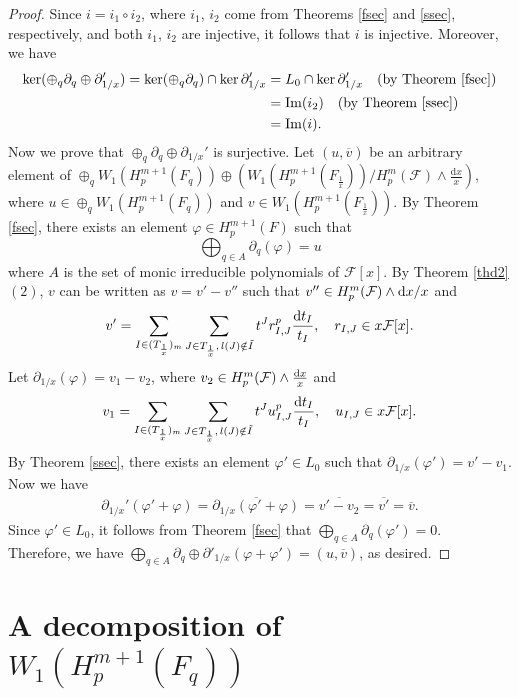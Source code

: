 \documentclass[times,10pt]{amsart}
\newcommand{\dd}{{\rm d}}
\newcommand{\F}{\ensuremath{\mathcal{F}}}
\renewcommand{\phi}{\varphi}
\begin{document}
  \begin{proof}
       Since $i= i_1\circ i_2$, where $ i_1$, $i_2$ come from Theorems \ref{fsec} and \ref{ssec}, respectively, and both $i_1$, $i_2$ are injective, it follows that $i$ is  injective.   Moreover, we have \begin{align*}
            \ker ( \oplus_{q} \partial_q\oplus \partial_{1/x}')= \ker( \oplus_q\partial_q)\cap \ker\partial_{1/x}'&= L_0\cap \ker\partial_{1/x}'\quad \text{(by Theorem \ref{fsec})}\\&=  {\rm Im}(i_2)\quad \text{(by Theorem \ref{ssec})}\\&= {\rm Im}(i).
       \end{align*} Now we prove that $  \oplus_{q} \partial_q\oplus\partial_{1/x}'$ is surjective. Let $ (   u, \overline{v})$ be an  arbitrary element of $ \oplus_{q}W_1(H_p^{m+1}(F_q))\oplus \left({ W_1(H_p^{m+1}( F_{\frac{1}{x}}))}/{ H_p^m(\mathcal{F})\wedge { \frac{\mathrm{d}x}{x}}}\right)$, where $ u\in \oplus_{q}W_1(H_p^{m+1}(F_q))$ and $v\in W_1(H_p^{m+1}( F_{\frac{1}{x}})) $. By Theorem \ref{fsec}, there exists an element $\phi\in  H_p^{m+1}( F)$ such that $$  \bigoplus_{q\in A} \partial_q( \phi)=u$$ where   $A$ is the set of  monic irreducible polynomials of $\F[x]$.  By Theorem \ref{thd2} $(2)$, $v$ can be written as  $v= v'-v''$  such that $ v''\in H_p^{m}(\F)\wedge \dd x/x $ and $$  v'= \sum_{I\in (T_{\frac{1}{x}})_m}\sum_{J\in T_{\frac{1}{x}},\, l(J)\notin \tilde{I}}  t^J r^p_{I,J} \frac{\dd t_I}{t_I}, \quad r_{I,J}\in x\F[x].$$ Let $\partial_{1/x}(\phi)= v_1-v_2$, where $ v_2\in H_p^{m}(\F)\wedge \frac{\dd x}{x}$ and $$  v_1= \sum_{I\in (T_{\frac{1}{x}})_m}\sum_{J\in T_{\frac{1}{x}},\, l(J)\notin \tilde{I}}  t^J {u}^p_{I,J} \frac{\dd t_I}{t_I}, \quad u_{I,J}\in x\F[x].$$ By Theorem \ref{ssec}, there exists an element $ \phi'\in L_0$ such that $\partial_{1/x}(\phi')= v'-v_1$. Now we have \begin{align*}
           \partial_{1/x}'( \phi'+\phi)= \overline{ \partial_{1/x}(\phi'+\phi)}= \overline{v'-v_2}=\overline{v'}=\overline{v}.
       \end{align*} Since $  \phi'\in L_0$,  it follows from Theorem \ref{fsec} that   $\bigoplus\limits_{q\in A} \partial_q(\phi')=0$.\\ Therefore, we have  $ \bigoplus\limits_{q\in A}\partial_q\oplus\partial'_{1/x}(\phi+ \phi')=(u,\overline{v})$, as desired. 
  \end{proof}

 


\section{A decomposition of  $W_1(H_p^{m+1}(F_q))$ }\label{5sad} 
\end{document}
